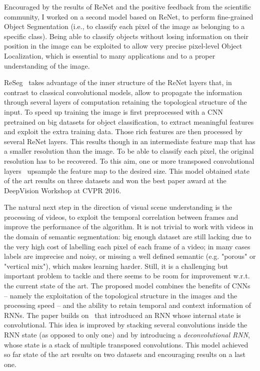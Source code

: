 Encouraged by the results of ReNet and the positive feedback from the
scientific community, I worked on a second model based on ReNet, to perform
fine-grained Object Segmentation (i.e., to classify each pixel of the image as
belonging to a specific class). Being able to classify objects without losing
information on their position in the image can be exploited to allow very
precise pixel-level Object Localization, which is essential to many
applications and to a proper understanding of the image.

ReSeg~\citep{Visin_2016_CVPR_Workshops} takes advantage of the inner structure
of the ReNet layers that, in contrast to classical convolutional models, allow
to propagate the information through several layers of computation retaining
the topological structure of the input. To speed up training the image is first
preprocessed with a CNN pretrained on big datasets for object classification,
to extract meaningful features and exploit the extra training data. Those rich
features are then processed by several ReNet layers. This results though in an
intermediate feature map that has a smaller resolution than the image. To be
able to classify each pixel, the original resolution has to be recovered. To
this aim, one or more transposed convolutional layers~\citep{dumoulin2016guide}
upsample the feature map to the desired size. This model obtained state of the
art results on three datasets and won the best paper award at the DeepVision
Workshop at CVPR 2016.

The natural next step in the direction of visual scene understanding is the
processing of videos, to exploit the temporal correlation between frames and
improve the performance of the algorithm. It is not trivial to work with videos
in the domain of semantic segmentation: big enough dataset are still lacking
due to the very high cost of labelling each pixel of each frame of a video; in
many cases labels are imprecise and noisy, or missing a well defined semantic
(e.g. "porous" or "vertical mix"), which makes learning harder. Still, it is
a challenging but important problem to tackle and there seems to be room for
improvement w.r.t. the current state of the art. The proposed model combines
the benefits of CNNs -- namely the exploitation of the topological structure in
the images and the processing speed -- and the ability to retain temporal and
context information of RNNs. The paper builds
on~\cite{xingjian2015convolutional} that introduced an RNN whose internal state
is convolutional. This idea is improved by stacking several convolutions inside
the RNN state (as opposed to only one) and by introducing a
\emph{deconvolutional RNN}, whose state is a stack of multiple transposed
convolutions. This model achieved so far state of the art results on two
datasets and encouraging results on a last one.

